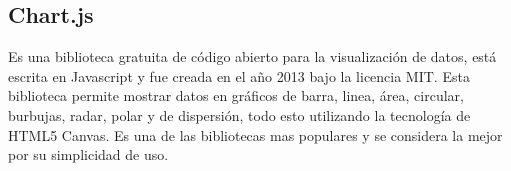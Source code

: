 \subsection{Chart.js}

Es una biblioteca gratuita de código abierto para la visualización de datos, está escrita en Javascript y fue creada en el año 2013 bajo la licencia MIT. Esta biblioteca permite mostrar datos en gráficos de barra, linea, área, circular, burbujas, radar, polar y de dispersión, todo esto utilizando la tecnología de HTML5 Canvas. Es una de las bibliotecas mas populares y se considera la mejor por su simplicidad de uso.
